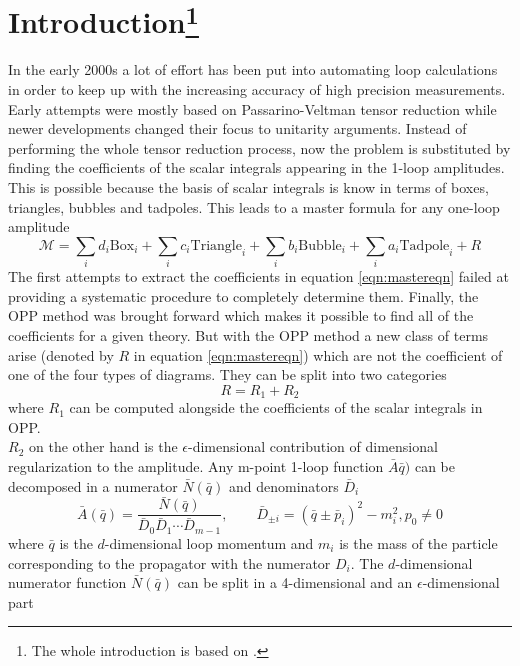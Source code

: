 \section{Introduction\footnote{The whole introduction is based on \cite{R2QCD,R2QED}.}}
\label{sec:Introduction} 
In the early 2000s a lot of effort has been put into automating loop calculations in order to keep up with the increasing accuracy of high precision measurements. Early attempts were mostly based on Passarino-Veltman tensor reduction while newer developments changed their focus to unitarity arguments. Instead of performing the whole tensor reduction process, now the problem is substituted by finding the coefficients of the scalar integrals appearing in the 1-loop amplitudes. This is possible because the basis of scalar integrals is know in terms of boxes, triangles, bubbles and tadpoles. This leads to a master formula for any one-loop amplitude 
\begin{equation}
\label{eqn:mastereqn}
\mathcal{M} = \sum_i d_i \mathrm{Box}_i + \sum_i c_i \mathrm{Triangle}_i + \sum_i b_i \mathrm{Bubble}_i + \sum_i a_i \mathrm{Tadpole}_i + R
\end{equation}
The first attempts to extract the coefficients in equation \ref{eqn:mastereqn} failed at providing a systematic procedure to completely determine them. Finally, the OPP method was brought forward which makes it possible to find all of the coefficients for a given theory. But with the OPP method a new class of terms arise (denoted by $R$ in equation \ref{eqn:mastereqn}) which are not the coefficient of one of the four types of diagrams. They can be split into two categories
\begin{equation}
R = R_1 + R_2
\end{equation}
where $R_1$ can be computed alongside the coefficients of the scalar integrals in OPP. \\
$R_2$ on the other hand is the $\epsilon$-dimensional contribution of dimensional regularization to the amplitude. Any m-point 1-loop function $\bar{A}\bar{q})$ can be decomposed in a numerator $\bar{N}( \bar{q})$ and denominators $\bar{D}_i$
\begin{equation}
\label{eqn:amp}
\bar{A} (\bar{q}) = \frac{\bar{N}(\bar{q})}{\bar{D}_0\bar{D}_1\cdots\bar{D}_{m-1}}, \qquad \bar{D}_{\pm i} = \left( \bar{q} \pm \bar{p}_i \right)^2 - m_i^2, p_0 \neq 0
\end{equation}
where $\bar{q}$ is the $d$-dimensional loop momentum and $m_i$ is the mass of the particle corresponding to the propagator with the numerator $D_i$. The $d$-dimensional numerator function $\bar{N}(\bar{q})$ can be split in a 4-dimensional and an $\epsilon$-dimensional part 
